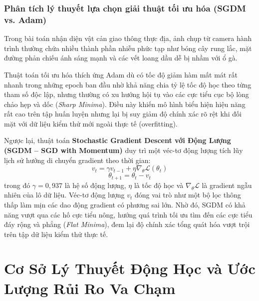 \documentclass[12pt,a4paper]{article}
\begin{document}
\subsubsection{Phân tích lý thuyết lựa chọn giải thuật tối ưu hóa (SGDM vs. Adam)}
Trong bài toán nhận diện vật cản giao thông thực địa, ảnh chụp từ camera hành trình thường chứa nhiều thành phần nhiễu phức tạp như bóng cây rung lắc, mặt đường phản chiếu ánh sáng mạnh và các vết loang dầu dễ bị nhầm với ổ gà.

Thuật toán tối ưu hóa thích ứng Adam dù có tốc độ giảm hàm mất mát rất nhanh trong những epoch ban đầu nhờ khả năng chia tỷ lệ tốc độ học theo từng tham số độc lập, nhưng thường có xu hướng hội tụ vào các cực tiểu cục bộ lòng chảo hẹp và dốc (\textit{Sharp Minima}). Điều này khiến mô hình biểu hiện hiệu năng rất cao trên tập huấn luyện nhưng lại bị suy giảm độ chính xác rõ rệt khi đối mặt với dữ liệu kiểm thử mới ngoài thực tế (overfitting).

Ngược lại, thuật toán \textbf{Stochastic Gradient Descent với Động Lượng (SGDM -- SGD with Momentum)} duy trì một véc-tơ động lượng tích lũy lịch sử hướng di chuyển gradient theo thời gian:
\begin{equation}
\label{eq:sgdm_velocity}
v_{t} = \gamma v_{t-1} + \eta \nabla_\theta \mathcal{L}(\theta_t)
\end{equation}
\begin{equation}
\label{eq:sgdm_update}
\theta_{t+1} = \theta_t - v_t
\end{equation}
trong đó $\gamma = 0,937$ là hệ số động lượng, $\eta$ là tốc độ học và $\nabla_\theta \mathcal{L}$ là gradient ngẫu nhiên của lô dữ liệu. Véc-tơ động lượng $v_t$ đóng vai trò như một bộ lọc thông thấp làm mịn các dao động gradient có phương sai lớn. Nhờ đó, SGDM có khả năng vượt qua các hố cực tiểu nông, hướng quá trình tối ưu tìm đến các cực tiểu đáy rộng và phẳng (\textit{Flat Minima}), đem lại độ chính xác tổng quát hóa vượt trội trên tập dữ liệu kiểm thử thực tế.

\newpage
\section{Cơ Sở Lý Thuyết Động Học và Ước Lượng Rủi Ro Va Chạm}
\label{sec:dong_hoc_va_rui_ro}
\end{document}
